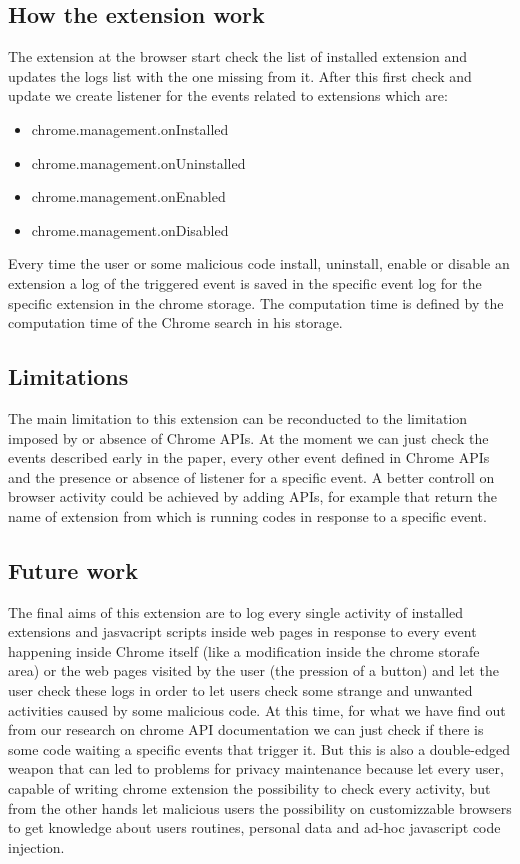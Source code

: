 \documentclass[12pt]{article}
\begin{document}
\begin{multicols}{2}
\subsection*{How the extension work}
The extension at the browser start check the list of installed extension and updates the logs list with the one missing from it.
After this first check and update we create listener for the events related to extensions which are: 
{\fontsize{10}{10}\selectfont
	\begin{itemize}
		\item  chrome.management.onInstalled
		\item  chrome.management.onUninstalled
		\item  chrome.management.onEnabled
		\item  chrome.management.onDisabled
	\end{itemize}
}
Every time the user or some malicious code install, uninstall, enable or disable an extension a log of the triggered event is saved in the specific event log for the specific extension in the chrome storage.
The computation time is defined by the computation time of the Chrome search in his storage.
\subsection*{Limitations}
The main limitation to this extension can be reconducted to the limitation imposed by or absence of Chrome APIs.
At the moment we can just check the events described early in the paper, every other event defined in Chrome APIs and the presence or absence of listener for a specific event.
A better controll on browser activity could be achieved by adding APIs, for example that return the name of extension from which is running codes in response to a specific event.
\subsection*{Future work}
The final aims of this extension are to log every single activity of installed extensions and jasvacript scripts inside web pages in response to every event happening inside Chrome itself (like a modification inside the chrome storafe area) or the web pages visited by the user (the pression of a button) and let the user check these logs	in order to let users check some strange and unwanted activities caused by some malicious code. At this time, for what we have find out from our research on chrome API documentation we can just check if there is some code waiting a specific events that trigger it.
But this is also a double-edged weapon that can led to problems for privacy maintenance because let every user, capable of writing chrome extension the possibility to check every activity, but from the other hands let malicious users the possibility  on customizzable browsers to get knowledge about users routines, personal data and ad-hoc javascript code injection.

\end{multicols}
\end{document}
